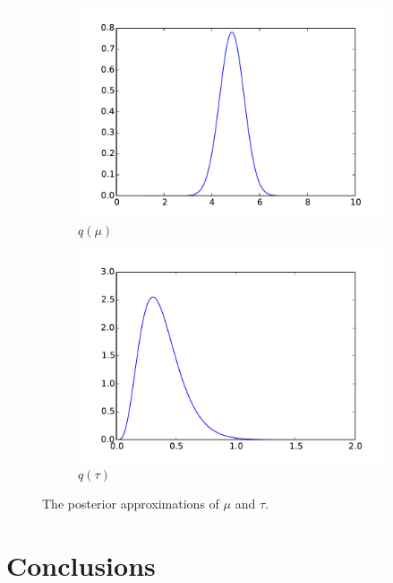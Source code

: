 \documentclass[twoside,11pt]{article}
\begin{document}
\begin{figure}
  \begin{center}
    \begin{subfigure}[b]{0.4\textwidth}
      \includegraphics[width=\textwidth]{fig_mu}
      \caption{$q(\mu)$}
    \end{subfigure}
    \begin{subfigure}[b]{0.4\textwidth}
      \includegraphics[width=\textwidth]{fig_tau}
      \caption{$q(\tau)$}
    \end{subfigure}
  \end{center}
  \caption{The posterior approximations of $\mu$ and $\tau$.}
  \label{fig:posterior}
\end{figure}

\section{Conclusions}
\end{document}
